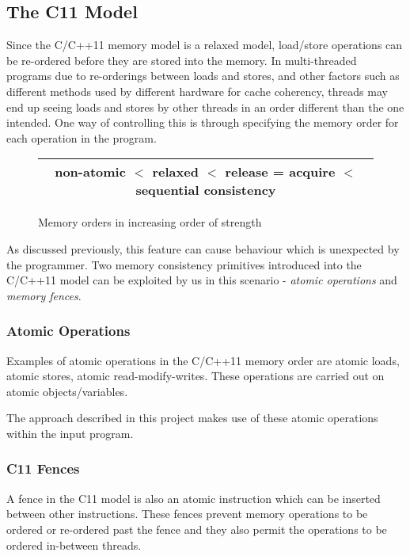\subsection{The C11 Model}
\par
Since the C/C++11 memory model is a relaxed model, load/store operations can be re-ordered before they are stored into the memory. In multi-threaded programs due to re-orderings between loads and stores, and other factors such as different methods used by different hardware for cache coherency, threads may end up seeing loads and stores by other threads in an order different than the one intended. One way of controlling this is through specifying the memory order for each operation in the program.

\begin{figure}
	\begin{center}
		\begin{tabular}{|c|}
		\hline
		non-atomic $<$ relaxed $<$ release = acquire $<$ sequential consistency\\
		\hline
		\end{tabular}
	\caption{Memory orders in increasing order of strength}\label{fig:mo_strength}
	\end{center}
\end{figure}

As discussed previously, this feature can cause behaviour which is unexpected by the programmer. Two memory consistency primitives introduced into the C/C++11 model can be exploited by us in this scenario - \textit{atomic operations} and \textit{memory fences}. 

\subsubsection{Atomic Operations}
Examples of atomic operations in the C/C++11 memory order are atomic loads, atomic stores, atomic read-modify-writes. These operations are carried out on atomic objects/variables.


The approach described in this project makes use of these atomic operations within the input program.

\subsubsection{C11 Fences}
\par
A fence in the C11 model is also an atomic instruction which can be inserted between other instructions. These fences prevent memory operations to be ordered or re-ordered past the fence and they also permit the operations to be ordered in-between threads. 

